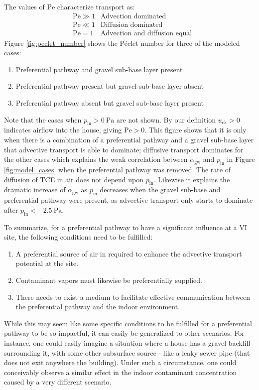 The values of $\mathrm{Pe}$ characterize transport as:
\begin{align*}
  &\mathrm{Pe} \gg 1 & \text{Advection dominated} \\
  &\mathrm{Pe} \ll 1 & \text{Diffusion dominated} \\
  &\mathrm{Pe} = 1 & \text{Advection and diffusion equal}
\end{align*}
Figure \ref{fig:peclet_number} shows the Péclet number for three of the modeled cases:
\begin{enumerate}
  \item Preferential pathway and gravel sub-base layer present
  \item Preferential pathway present but gravel sub-base layer absent
  \item Preferential pathway absent but gravel sub-base layer present
\end{enumerate}
Note that the cases when $p_\mathrm{in} > \SI{0}{\pascal}$ are not shown.
By our definition $u_\mathrm{ck} > 0$ indicates airflow into the house, giving $\mathrm{Pe} > 0$.
This figure shows that it is only when there is a combination of a preferential pathway and a gravel sub-base layer that advective transport is able to dominate; diffusive transport dominates for the other cases which explains the weak correlation between $\alpha_\mathrm{gw}$ and $p_\mathrm{in}$ in Figure \ref{fig:model_cases} when the preferential pathway was removed.
The rate of diffusion of TCE in air does not depend upon $p_\mathrm{in}$.
Likewise it explains the dramatic increase of $\alpha_\mathrm{gw}$ as $p_\mathrm{in}$ decreases when the  gravel sub-base and preferential pathway were present, as advective transport only starts to dominate after $p_\mathrm{in} < \SI{-2.5}{\pascal}$.\par

To summarize, for a preferential pathway to have a significant influence at a VI site, the following conditions need to be fulfilled:
\begin{enumerate}
  \item A preferential source of air in required to enhance the advective transport potential at the site.
  \item Contaminant vapors must likewise be preferentially supplied.
  \item There needs to exist a medium to facilitate effective communication between the preferential pathway and the indoor environment.
\end{enumerate}
While this may seem like some specific conditions to be fulfilled for a preferential pathway to be so impactful, it can easily be generalized to other scenarios.
For instance, one could easily imagine a situation where a house has a gravel backfill surrounding it, with some other subsurface source - like a leaky sewer pipe (that does not exit anywhere the building).
Under such a circumstance, one could conceivably observe a similar effect in the indoor contaminant concentration caused by a very different scenario.\par

